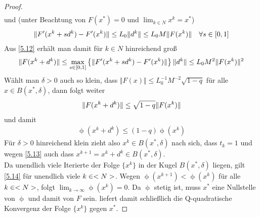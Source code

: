 \begin{proof}
\begin{align}
	\end{align}
	und (unter Beachtung von $F(x^\ast)=0$ und $\lim_{k\in N}x^k=x^\ast$)
	\begin{align}
		\Vert F'(x^k+sd^k) - F'(x^k)\Vert \le L_0\Vert d^k\Vert\le L_0M\Vert F(x^k)\Vert\quad\forall s\in [0,1]\notag
	\end{align}
	Aus \cref{5.12} erhält man damit für $k\in N$ hinreichend groß
	\begin{align}
		\Vert F(x^k+d^k)\Vert \le\max\limits_{s\in [0,1]} \left\lbrace \Vert F'(x^k + sd^k) - F'(x^k)\Vert\right\rbrace \Vert d^k\Vert\le L_0M^2\Vert F(x^k)\Vert^2\notag
	\end{align}
	Wählt man $\delta>0$ auch so klein, dass $\Vert F(x)\Vert\le L_0^{-1}M^{-2}\sqrt{1-q}$ für alle $x\in B(x^\ast,\delta)$, dann folgt weiter
	\begin{align}
		\Vert F(x^k+d^k)\Vert \le \sqrt{1-q}\Vert F(x^k)\Vert\notag 
	\end{align}
	und damit
	\begin{align}
		\label{5.14}
		\upphi(x^k+d^k) \le (1-q)\upphi(x^k)
	\end{align}
	Für $\delta>0$ hinreichend klein zieht also $x^k\in B(x^\ast,\delta)$ nach sich, dass $t_k=1$ und wegen \cref{5.13} auch dass $x^{k+1}=x^k+d^k\in B(x^\ast,\delta)$. \\
	Da unendlich viele Iterierte der Folge $\{x^k\}$ in der Kugel $B(x^\ast,\delta)$ liegen, gilt \cref{5.14} für unendlich viele $k\in <N>$. Wegen $\upphi(x^{k+1})<\upphi(x^k)$ für alle $k\in<N>$, folgt $\lim_{k\to\infty}\upphi(x^k)=0$. Da $\upphi$ stetig ist, muss $x^\ast$ eine Nullstelle von $\upphi$ und damit von $F$ sein.  liefert damit schließlich die Q-quadratische Konvergenz der Folge $\{x^k\}$ gegen $x^\ast$.
\end{proof}